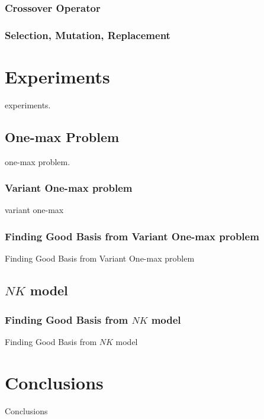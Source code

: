 \subsubsection{Crossover Operator}

\subsubsection{Selection, Mutation, Replacement}

\section{Experiments}
experiments.
\subsection{One-max Problem}
one-max problem.
\subsubsection{Variant One-max problem}
variant one-max

\subsubsection{Finding Good Basis from Variant One-max problem}
Finding Good Basis from Variant One-max problem

\subsection{$ NK $ model}
\subsubsection{Finding Good Basis from $ NK $ model}
Finding Good Basis from $ NK $ model

\section{Conclusions}
Conclusions


